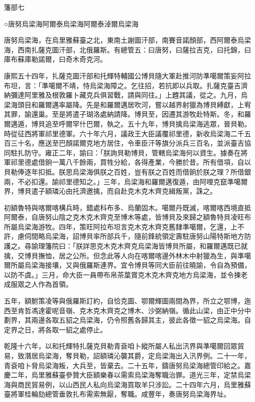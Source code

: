 
\begin{pinyinscope}
籓部七

○唐努烏梁海阿爾泰烏梁海阿爾泰淖爾烏梁海

唐努烏梁海，在烏里雅蘇臺之北，東南土謝圖汗部，南賽音諾顏部，西阿爾泰烏梁海，西南扎薩克圖汗部，北俄羅斯。有總管五：曰唐努，曰薩拉吉克，曰托錦，曰庫布蘇庫勒諾爾，曰奇木奇克河。

康熙五十四年，扎薩克圖汗部和托輝特輔國公博貝隨大軍赴推河防準噶爾策妄阿拉布坦，言：「準噶爾不靖，恃烏梁海障之。乞往招，若抗即以兵取。扎薩克臺吉濟納彌達阿里雅及根敦羅卜藏克兵俱習戰，請與同往。」上韙其議，從之。九月，烏梁海頭目和羅爾邁率屬降。先是和羅爾邁居吹河，嘗以越界射獵為博貝縛獻，上宥其罪，諭還巢。至是將遣子瑚洛處納請降。博貝至，因遷其游牧赴特斯。冬，和羅爾邁遁，博貝追至呼爾罕什巴爾，執之。五十九年，博貝擒烏梁海逃眾，晉貝勒。時從征西將軍祁里德軍。六十年六月，議政王大臣議覆祁里德，新收烏梁海二千五百三十名，應送至巴顏諾爾克地方居住，令車臣汗等旗分派兵三百名，並派臺吉協同駐扎防守。雍正二年，諭曰：「朕詢貝勒博貝，管轄烏梁海何以資生。據奏在將軍祁里德處借餉一萬八千餘兩，買牲分給，各得產業，今勝於昔。所有借項，自以貝勒俸逐年扣抵。朕思烏梁海俱朕之百姓，豈有朕之百姓而借餉於朕之理？所借銀兩，不必扣還。諭祁里德知之。」三年，烏梁海和羅爾邁復遁，由阿哩克竄準噶爾界，博貝遣子額璘沁由托濟邀擒，而自赴克木克木齊克緝叛黨，誅之。

初額魯特與喀爾喀構兵時，錯處科布多、烏蘭固木。噶爾丹既滅，喀爾喀西境直抵阿爾泰，自唐努山陰之克木克木齊克至博木等處，皆博貝及來歸之額魯特貝凌旺布所屬烏梁海游牧。四年，策旺阿拉布坦言克木克木齊克舊隸準噶爾，乞還，上不許，慮伺間略烏梁海，詔博貝率所部兵千，隨前鋒統領定壽駐唐努山陽特斯地方防護之。尋諭理籓院曰：「朕詳思克木克木齊克烏梁海皆博貝所屬，和羅爾邁既已就擒，交博貝撫恤，居之公所。但念此等人向在喀爾喀邊外林木中射獵為生，與準噶爾所屬烏梁海接壤，又與俄羅斯連界。宜令博貝等同大臣前往曉諭，令自為預備，以防不虞。」三月，命大臣一員帶布帛茶葉賞克木克木齊克地方烏梁海，並令揀老成服眾之人作為首領。

五年，額駙策凌等與俄羅斯訂約，自恰克圖、鄂爾輝圖兩間為界，所立之鄂博，迤西至肯哲馮達霍呢音嶺、克木克木齊克之博木、沙弼納嶺。循此山梁，由正中分中劃界，其兩邊各取五貂之烏梁海，仍令照舊各歸其主，彼此各徵一貂之烏梁海。自定界之日，將各取一貂之處停止。

乾隆十六年，以和托輝特扎薩克貝勒青袞咱卜縱所屬人私出汛界與準噶爾回眾貿易，致潛居烏梁海，奪貝勒，詔額璘沁襲其爵，定烏梁海出入汛界例。二十一年，青袞咱卜脅烏梁海叛，大兵至，皆棄去。二十五年，鑄唐努烏梁海總管印給之。嘉慶二年，烏里雅蘇臺參贊大臣額樂春以需索烏梁海奪職治罪。道光三年，定禁烏梁海與商民貿易例，以山西民人私向烏梁海買取羊只涉訟。二十四年六月，烏里雅蘇臺將軍桂輪劾總管垂敦扎布需索無厭，奪職。咸豐年，奏唐努烏梁海界址。


\end{pinyinscope}
